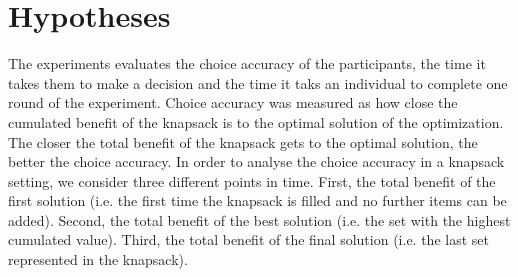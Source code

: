 \section{Hypotheses}
\label{ch:Literature Review:sec:Hypotheses}
The experiments evaluates the choice accuracy of the participants, the time it takes them to make a decision and the time it taks an individual to complete one round of the experiment.
Choice accuracy was measured as how close the cumulated benefit of the knapsack is to the optimal solution of the optimization. The closer the total benefit of the knapsack gets to the optimal solution, the better the choice accuracy.
In order to analyse the choice accuracy in a knapsack setting, we consider three different points in time. First, the total benefit of the first solution (i.e. the first time the knapsack is filled and no further items can be added). Second, the total benefit of the best solution (i.e. the set with the highest cumulated value). Third, the total benefit of the final solution (i.e. the last set represented in the knapsack).


